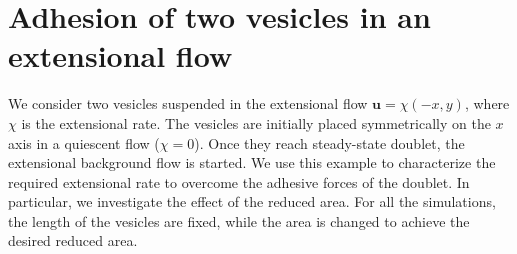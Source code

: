 \documentclass[aps,prl,twocolumn,showpacs,amsmath,amssymb]{revtex4-1}
\newcommand{\uu}{\mathbf{u}}
\begin{document}
%
%
%
%
%

\section{Adhesion of two vesicles in an extensional flow} 
\label{sec:eflow} 
We consider two vesicles suspended in the extensional flow $\uu =
\chi(-x,y)$, where $\chi$ is the extensional rate.  The vesicles are
initially placed symmetrically on the $x$ axis in a quiescent flow
($\chi = 0$).  Once they reach steady-state doublet, the extensional
background flow is started.  We use this example to characterize the
required extensional rate to overcome the adhesive forces of the
doublet.  In particular, we investigate the effect of the reduced area.
For all the simulations, the length of the vesicles are fixed, while the
area is changed to achieve the desired reduced area.
\end{document}
